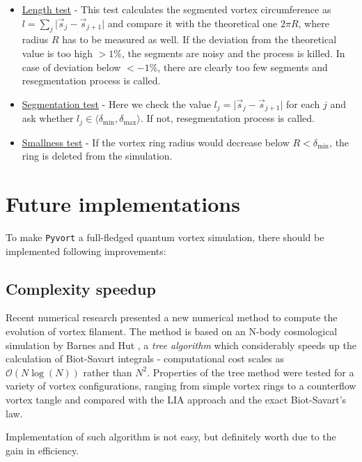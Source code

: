 \begin{itemize}
	\item \underline{Length test} - This test calculates the segmented vortex circumference as $l = \sum_j \vert \vec{s}_j - \vec{s}_{j+1} \vert$ and compare it with the theoretical one $2\pi R$, where radius $R$ has to be measured as well. If the deviation from the theoretical value is too high $>1\%$, the segments are noisy and the process is killed. In case of deviation below $<-1\%$, there are clearly too few segments and resegmentation process is called.

	\item \underline{Segmentation test} - Here we check the value $l_j = \vert \vec{s}_j - \vec{s}_{j+1} \vert$ for each $j$ and ask whether $l_j \in \langle \delta_{\text{min}}, \delta_{\text{max}} \rangle$. If not, resegmentation process is called.

	\item \underline{Smallness test} - If the vortex ring radius would decrease below $R < \delta_{\text{min}}$, the ring is deleted from the simulation.
\end{itemize}

\section{Future implementations}

To make \texttt{Pyvort} a full-fledged quantum vortex simulation, there should be implemented following improvements:

\subsection*{Complexity speedup}

Recent numerical research presented \cite{tree_alg} a new numerical method to compute the evolution of vortex filament. The method is based on an N-body cosmological simulation by Barnes and Hut \cite{barnes}, a \textit{tree algorithm} which considerably speeds up the calculation of Biot-Savart integrals - computational cost scales as $\mathcal{O}(N \log(N))$ rather than $N^2$. Properties of the tree method were tested for a variety of vortex configurations, ranging from simple vortex rings to a counterflow vortex tangle and compared with the LIA approach and the exact Biot-Savart's law.

Implementation of such algorithm is not easy, but definitely worth due to the gain in efficiency.


